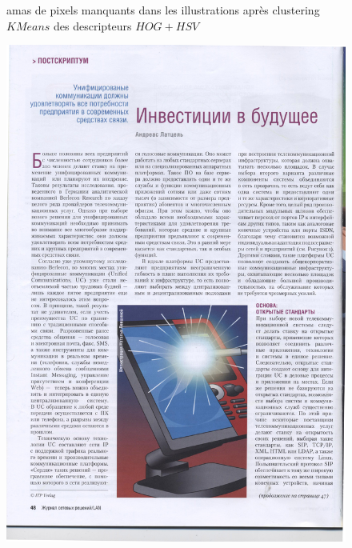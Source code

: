 \documentclass{book}
\begin{document}
\begin{figure}[H]
\begin{center}
\end{center}
\caption{amas de pixels manquants dans les illustrations après clustering $KMeans$ des descripteurs $HOG+HSV$}
\label{rect1}
\end{figure}

\begin{figure}[H]
\begin{center}
\includegraphics[scale=0.06]{images/rect_50.jpg}

\end{center}
\end{figure}
\end{document}
